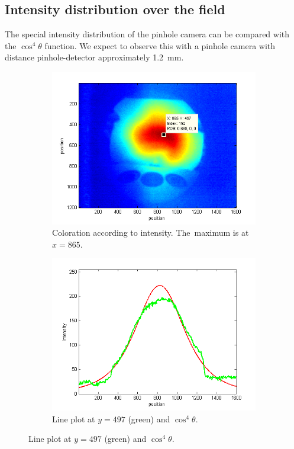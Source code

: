 \documentclass[a4paper, 12pt]{paper}
\begin{document}
\subsection{Intensity distribution over the field}

The special intensity distribution of the pinhole camera can be compared with the $\cos^4 \theta$ function.
We expect to observe this with a pinhole camera with distance pinhole-detector approximately \SI{1.2}{\milli\meter}.

\begin{figure}[H]
    \centering
    \begin{subfigure}[t]{0.45\textwidth}
        \includegraphics[width=\textwidth]{img/intensity_plot}
        \caption{Coloration according to intensity. The~maximum is at $x = 865$.}
    \end{subfigure}
    \begin{subfigure}[t]{0.45\textwidth}
        \includegraphics[width=\textwidth]{img/intensity_line_plot}
        \caption{Line plot at $y = 497$ (green) and $\cos^4 \theta$.}
    \end{subfigure}
\label{fig:intensity}
\end{figure}
\end{document}
